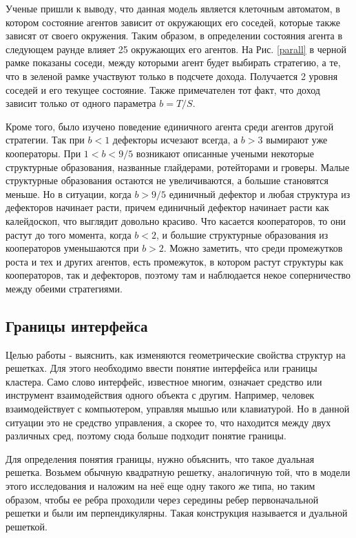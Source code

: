 \documentclass[a4paper]{article}
\begin{document}
	
	
	
	\par Ученые пришли к выводу, что данная модель является клеточным автоматом, в котором состояние агентов зависит от окружающих его соседей, которые также зависят от своего окружения. Таким образом, в определении состояния агента в следующем раунде влияет 25 окружающих его агентов. На Рис. \ref{parall} в черной рамке показаны соседи, между которыми агент будет выбирать стратегию, а те, что в зеленой рамке участвуют только в подсчете дохода. Получается 2 уровня соседей и его текущее состояние. Также примечателен тот факт, что доход зависит только от одного параметра $b=T/S$. 
	
	\par Кроме того, было изучено поведение единичного агента среди агентов другой стратегии. Так при $b<1$ дефекторы исчезают всегда, а $b>3$ вымирают уже кооператоры. При $1<b<9/5$ возникают описанные учеными некоторые структурные образования, названные глайдерами, ротейторами и гроверы. Малые структурные образования остаются не увеличиваются, а большие становятся меньше. Но в ситуации, когда $b>9/5$ единичный дефектор и любая структура из дефекторов начинает расти, причем единичный дефектор начинает расти как калейдоскоп, что выглядит довольно красиво. Что касается кооператоров, то они растут до того момента, когда $b<2$, и большие структурные образования из кооператоров уменьшаются при $b>2$. Можно заметить, что среди промежутков роста и тех и других агентов, есть промежуток, в котором растут структуры как кооператоров, так и дефекторов, поэтому там и наблюдается некое соперничество между обеими стратегиями.
	
	\subsection{Границы интерфейса}
	
	\par Целью работы - выяснить, как изменяются геометрические свойства структур на решетках. Для этого необходимо ввести понятие интерфейса или границы кластера. Само слово интерфейс, известное многим, означает средство или инструмент взаимодействия одного объекта с другим. Например, человек взаимодействует с компьютером, управляя мышью или клавиатурой. Но в данной ситуации это не средство управления, а скорее то, что находится между двух различных сред, поэтому сюда больше подходит понятие границы.
	
	\par Для определения понятия границы, нужно объяснить, что такое дуальная решетка. Возьмем обычную квадратную решетку, аналогичную той, что в модели этого исследования и наложим на неё еще одну такого же типа, но таким образом, чтобы ее ребра проходили через середины ребер первоначальной решетки и были им перпендикулярны. Такая конструкция называется и дуальной решеткой.
	
\end{document}
